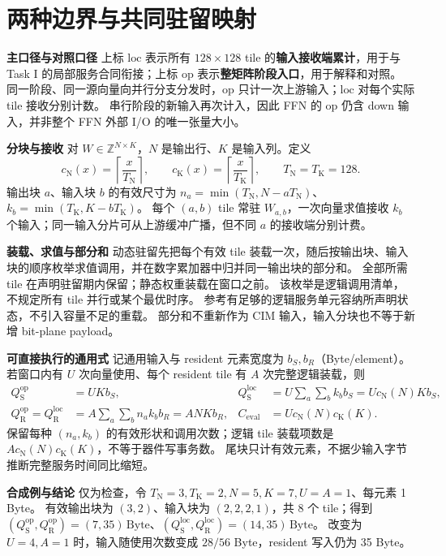 \documentclass[11pt,a4paper,fontset=fandol]{ctexart}
\newcommand{\op}{\mathrm{op}}
\newcommand{\loc}{\mathrm{loc}}
\newcommand{\cn}[1]{c_{\mathrm N}\!\left(#1\right)}
\newcommand{\ck}[1]{c_{\mathrm K}\!\left(#1\right)}
\newcommand{\tN}{T_{\mathrm N}}
\newcommand{\tK}{T_{\mathrm K}}
\newcommand{\Byte}{\,\mathrm{Byte}}
\newcommand{\qso}{Q_{\mathrm S}^{\op}}
\newcommand{\qsl}{Q_{\mathrm S}^{\loc}}
\newcommand{\qro}{Q_{\mathrm R}^{\op}}
\newcommand{\qrl}{Q_{\mathrm R}^{\loc}}
\newcommand{\para}[1]{\par\smallskip\noindent\textbf{#1}\quad}
\begin{document}
\clearpage
\section{两种边界与共同驻留映射}
\para{主口径与对照口径}
上标 $\loc$ 表示所有 $128\times128$ tile 的\textbf{输入接收端累计}，用于与 Task I 的局部服务合同衔接；上标 $\op$ 表示\textbf{整矩阵阶段入口}，用于解释和对照。
同一阶段、同一源向量向并行分支分发时，$\op$ 只计一次上游输入；$\loc$ 对每个实际 tile 接收分别计数。
串行阶段的新输入再次计入，因此 FFN 的 $\op$ 仍含 down 输入，并非整个 FFN 外部 I/O 的唯一张量大小。

\para{分块与接收}
对 $W\in\mathbb Z^{N\times K}$，$N$ 是输出行、$K$ 是输入列。定义
\begin{equation}
\cn{x}=\left\lceil\frac{x}{\tN}\right\rceil,\qquad
\ck{x}=\left\lceil\frac{x}{\tK}\right\rceil,\qquad \tN=\tK=128.
\end{equation}
输出块 $a$、输入块 $b$ 的有效尺寸为 $n_a=\min(\tN,N-a\tN)$、$k_b=\min(\tK,K-b\tK)$。
每个 $(a,b)$ tile 常驻 $W_{a,b}$，一次向量求值接收 $k_b$ 个输入；同一输入分片可从上游缓冲广播，但不同 $a$ 的接收端分别计费。

\para{装载、求值与部分和}
动态驻留先把每个有效 tile 装载一次，随后按输出块、输入块的顺序枚举求值调用，并在数字累加器中归并同一输出块的部分和。
全部所需 tile 在声明驻留期内保留；静态权重装载在窗口之前。
该枚举是逻辑调用清单，不规定所有 tile 并行或某个最优时序。
参考有足够的逻辑服务单元容纳所声明状态，不引入容量不足的重载。
部分和不重新作为 CIM 输入，输入分块也不等于新增 bit-plane payload。

\para{可直接执行的通用式}
记通用输入与 resident 元素宽度为 $b_S,b_R$（Byte/element）。若窗口内有 $U$ 次向量使用、每个 resident tile 有 $A$ 次完整逻辑装载，则
\begin{align}
\qso&=UKb_S,&\qsl&=U\sum_a\sum_b k_b b_S=U\cn{N}Kb_S,\label{eq:generic-s}\\
\qro=\qrl&=A\sum_a\sum_b n_a k_b b_R=ANKb_R,&
C_{\mathrm{eval}}&=U\cn{N}\ck{K}.\label{eq:generic-r}
\end{align}
保留每种 $(n_a,k_b)$ 的有效形状和调用次数；逻辑 tile 装载项数是 $A\cn{N}\ck{K}$，不等于器件写事务数。
尾块只计有效元素，不据少输入字节推断完整服务时间同比缩短。

\para{合成例与结论}
仅为检查，令 $\tN=3,\tK=2,N=5,K=7,U=A=1$、每元素 1 Byte。
有效输出块为 $(3,2)$、输入块为 $(2,2,2,1)$，共 8 个 tile；得到
$(\qso,\qro)=(7,35)\Byte$、$(\qsl,\qrl)=(14,35)\Byte$。
改变为 $U=4,A=1$ 时，输入随使用次数变成 $28/56$ Byte，resident 写入仍为 35 Byte。
\end{document}
